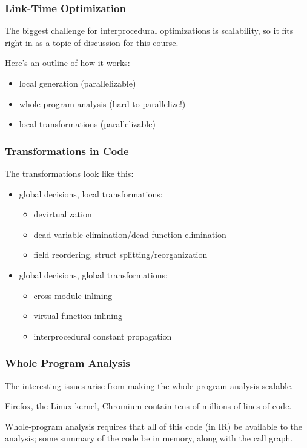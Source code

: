\begin{frame}
\frametitle{Link-Time Optimization}

The biggest challenge for interprocedural optimizations is scalability, so 
it fits right in as a topic of discussion for this course.

Here's an outline of how it works:
\begin{itemize}
\item local generation (parallelizable)
\item whole-program analysis (hard to parallelize!)
\item local transformations (parallelizable)
\end{itemize}

\end{frame}


\begin{frame}
\frametitle{Transformations in Code}

The transformations look like this:
\begin{itemize}
\item global decisions, local transformations:
\begin{itemize}
\item devirtualization
\item dead variable elimination/dead function elimination
\item field reordering, struct splitting/reorganization
\end{itemize}
\item global decisions, global transformations:
\begin{itemize}
\item cross-module inlining
\item virtual function inlining
\item interprocedural constant propagation
\end{itemize}
\end{itemize}


\end{frame}


\begin{frame}
\frametitle{Whole Program Analysis}

The interesting issues arise from making the whole-program analysis scalable. 

Firefox, the Linux kernel, Chromium contain tens of millions of lines of code. 

Whole-program analysis requires that all of 
this code (in IR) be available to the analysis; some summary of the code be in memory,  along with the call graph.

\end{frame}


